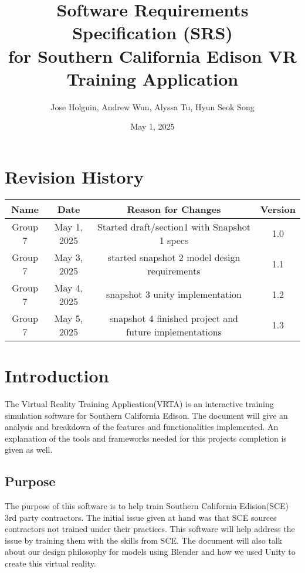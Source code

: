 \documentclass[12pt]{article}
\title{Software Requirements Specification (SRS)\\[1em] \large for Southern California Edison VR Training Application}
\author{Jose Holguin, Andrew Wun, Alyssa Tu, Hyun Seok Song}
\date{May 1, 2025}
\begin{document}
\maketitle
\thispagestyle{empty}
\newpage

\tableofcontents
\newpage

\section*{Revision History}
\begin{longtable}{|c|c|c|c|}
\hline
\textbf{Name} & \textbf{Date} & \textbf{Reason for Changes} & \textbf{Version} \\
\hline
Group 7 & May 1, 2025 & Started draft/section1 with Snapshot 1 specs & 1.0 \\
\hline
Group 7 & May 3, 2025 & started snapshot 2 model design requirements & 1.1 \\
\hline
Group 7 & May 4, 2025 & snapshot 3 unity implementation & 1.2 \\
\hline
Group 7 & May 5, 2025 & snapshot 4 finished project and future implementations & 1.3 \\
\hline
\end{longtable}
\newpage

\section{Introduction}
The Virtual Reality Training Application(VRTA) is an interactive training simulation software for Southern California Edison.
The document will give an analysis and breakdown of the features and functionalities implemented. An explanation of the 
tools and frameworks needed for this projects completion is given as well.

\subsection{Purpose}
The purpose of this software is to help train Southern California Edision(SCE) 3rd party contractors. 
The initial issue given at hand was that SCE sources contractors not trained under their practices. 
This software will help address the issue by training them with the skills from SCE.
The document will also talk about our design philosophy for models using Blender and how we
used Unity to create this virtual reality.
\end{document}

